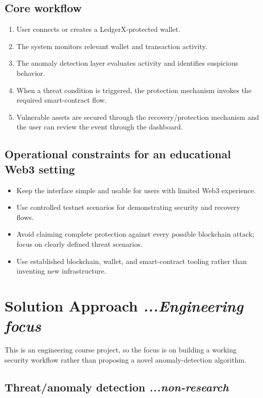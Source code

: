 \documentclass[10pt,a4paper]{article}
\begin{document}
\subsection{Core workflow}

\begin{enumerate}
    \item User connects or creates a LedgerX-protected wallet.
    \item The system monitors relevant wallet and transaction activity.
    \item The anomaly detection layer evaluates activity and identifies suspicious behavior.
    \item When a threat condition is triggered, the protection mechanism invokes the required smart-contract flow.
    \item Vulnerable assets are secured through the recovery/protection mechanism and the user can review the event through the dashboard.
\end{enumerate}

\subsection{Operational constraints for an educational Web3 setting}

\begin{itemize}
    \item Keep the interface simple and usable for users with limited Web3 experience.
    \item Use controlled testnet scenarios for demonstrating security and recovery flows.
    \item Avoid claiming complete protection against every possible blockchain attack; focus on clearly defined threat scenarios.
    \item Use established blockchain, wallet, and smart-contract tooling rather than inventing new infrastructure.
\end{itemize}

\section{Solution Approach \hfill \normalfont\itshape ...Engineering focus}

This is an engineering course project, so the focus is on building a working security workflow rather than proposing a novel anomaly-detection algorithm.

\subsection{Threat/anomaly detection \hfill \normalfont\itshape ...non-research}
\end{document}
